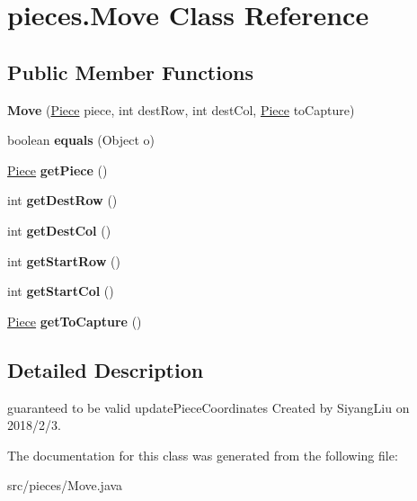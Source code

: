 \hypertarget{classpieces_1_1_move}{}\section{pieces.\+Move Class Reference}
\label{classpieces_1_1_move}
\subsection*{Public Member Functions}
\begin{DoxyCompactItemize}
\item 
\mbox{\label{classpieces_1_1_move_a9d8c8259fe150576a61ab1bf8448cb6f}} 
{\bfseries Move} (\mbox{\hyperlink{classpieces_1_1_piece}{Piece}} piece, int dest\+Row, int dest\+Col, \mbox{\hyperlink{classpieces_1_1_piece}{Piece}} to\+Capture)
\item 
\mbox{\label{classpieces_1_1_move_ae751299c10522a5e08447b384958b583}} 
boolean {\bfseries equals} (Object o)
\item 
\mbox{\label{classpieces_1_1_move_a4c1107627a4388558d5d340fa7a49e4a}} 
\mbox{\hyperlink{classpieces_1_1_piece}{Piece}} {\bfseries get\+Piece} ()
\item 
\mbox{\label{classpieces_1_1_move_a7462ffdd4e91afeeacaba11a22d13cea}} 
int {\bfseries get\+Dest\+Row} ()
\item 
\mbox{\label{classpieces_1_1_move_ad220de4832908acb96959e39812e3d8c}} 
int {\bfseries get\+Dest\+Col} ()
\item 
\mbox{\label{classpieces_1_1_move_a98ad8ca1d7fedb3e09af48a72e76ade1}} 
int {\bfseries get\+Start\+Row} ()
\item 
\mbox{\label{classpieces_1_1_move_ac0f85bd255bb8a5984537b4267665839}} 
int {\bfseries get\+Start\+Col} ()
\item 
\mbox{\label{classpieces_1_1_move_af78d432f0d3ac098ae38c6a5a1512a12}} 
\mbox{\hyperlink{classpieces_1_1_piece}{Piece}} {\bfseries get\+To\+Capture} ()
\end{DoxyCompactItemize}


\subsection{Detailed Description}
guaranteed to be valid update\+Piece\+Coordinates Created by Siyang\+Liu on 2018/2/3. 

The documentation for this class was generated from the following file\+:\begin{DoxyCompactItemize}
\item 
src/pieces/Move.\+java\end{DoxyCompactItemize}
